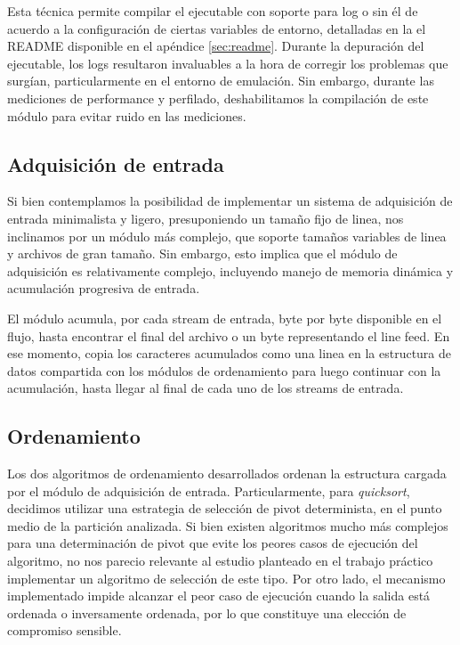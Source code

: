 \documentclass[a4paper,11pt]{article}
\begin{document}
Esta técnica permite compilar el ejecutable con soporte para log o sin él de
acuerdo a la configuración de ciertas variables de entorno, detalladas en la el
README disponible en el apéndice \ref{sec:readme}. Durante la depuración del
ejecutable, los logs resultaron invaluables a la hora de corregir los problemas
que surgían, particularmente en el entorno de emulación.  Sin embargo, durante
las mediciones de performance y perfilado, deshabilitamos la compilación de
este módulo para evitar ruido en las mediciones.

\subsection{Adquisición de entrada}

Si bien contemplamos la posibilidad de implementar un sistema de adquisición de
entrada minimalista y ligero, presuponiendo un tamaño fijo de linea, nos
inclinamos por un módulo más complejo, que soporte tamaños variables de linea y
archivos de gran tamaño. Sin embargo, esto implica que el módulo de adquisición
es relativamente complejo, incluyendo manejo de memoria dinámica y acumulación
progresiva de entrada.

El módulo acumula, por cada stream de entrada, byte por byte disponible en el
flujo, hasta encontrar el final del archivo o un byte representando el line
feed. En ese momento, copia los caracteres acumulados como una linea en la
estructura de datos compartida con los módulos de ordenamiento para luego
continuar con la acumulación, hasta llegar al final de cada uno de los streams
de entrada.

\subsection{Ordenamiento}\label{sec:ord}

Los dos algoritmos de ordenamiento desarrollados ordenan la estructura cargada
por el módulo de adquisición de entrada. Particularmente, para
\textit{quicksort}, decidimos utilizar una estrategia de selección de pivot
determinista, en el punto medio de la partición analizada. Si bien existen
algoritmos mucho más complejos para una determinación de pivot que evite los
peores casos de ejecución del algoritmo, no nos parecio relevante al estudio
planteado en el trabajo práctico implementar un algoritmo de selección de este
tipo. Por otro lado, el mecanismo implementado impide alcanzar el peor caso de
ejecución cuando la salida está ordenada o inversamente ordenada, por lo que
constituye una elección de compromiso sensible.
\end{document}
